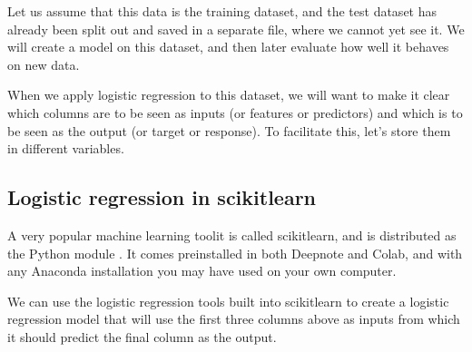 \documentclass[letterpaper,10pt,english]{jupyterBook}
\begin{document}
\sphinxAtStartPar
Let us assume that this data is the training dataset, and the test dataset has already been split out and saved in a separate file, where we cannot yet see it.  We will create a model on this dataset, and then later evaluate how well it behaves on new data.

\sphinxAtStartPar
When we apply logistic regression to this dataset, we will want to make it clear which columns are to be seen as inputs (or features or predictors) and which is to be seen as the output (or target or response).  To facilitate this, let’s store them in different variables.

\begin{sphinxVerbatim}[commandchars=\\\{\}]
  \PYG{p}{[}\PYG{p}{[}\PYG{p}{]}\PYG{p}{]}
    \PYG{p}{[}\PYG{p}{]}
\end{sphinxVerbatim}


\subsection{Logistic regression in scikit\sphinxhyphen{}learn}
\label{\detokenize{chapter-17-machine-learning:logistic-regression-in-scikit-learn}}
\sphinxAtStartPar
A very popular machine learning toolit is called scikit\sphinxhyphen{}learn, and is distributed as the Python module .  It comes pre\sphinxhyphen{}installed in both Deepnote and Colab, and with any Anaconda installation you may have used on your own computer.

\sphinxAtStartPar
We can use the logistic regression tools built into scikit\sphinxhyphen{}learn to create a logistic regression model that will use the first three columns above as inputs from which it should predict the final column as the output.

\begin{sphinxVerbatim}[commandchars=\\\{\}]
   

  
   
\end{sphinxVerbatim}
\end{document}
